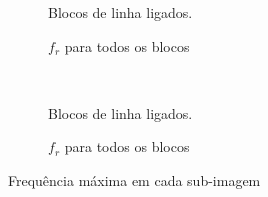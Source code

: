 \documentclass[10pt,a4paper]{article}
\begin{document}
\begin{figure}[!htb]
\begin{subfigure}[ht]{0.45\textwidth}
        \caption{Blocos de linha ligados.}
        \label{fig:fingerprint}
    \end{subfigure}
    \qquad
    \begin{subfigure}[ht]{0.45\textwidth}
        \caption{$f_r$ para todos os blocos}
        \label{fig:fingerprint_all}
    \end{subfigure}
    \\
    \begin{subfigure}[ht]{0.45\textwidth}
    \centering
        \caption{Blocos de linha ligados.}
        \label{fig:fingerprint}
    \end{subfigure}
    \qquad
    \begin{subfigure}[ht]{0.45\textwidth}
        \caption{$f_r$ para todos os blocos}
        \label{fig:fingerprint_all}
    \end{subfigure}
    \caption{Frequência máxima em cada sub-imagem}
    \label{fig:all}
\end{figure}
\end{document}
